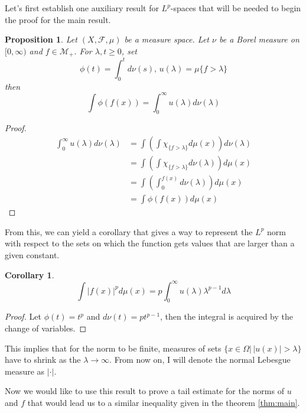 \documentclass[12pt]{artikel1}
\newtheorem{proposition}{Proposition}[section]
\newtheorem{corollary}{Corollary}[theorem]
\begin{document}
Let's first establish one auxiliary result for $L^p$-spaces that will be needed to begin the proof for the main result. 

\begin{proposition}
    Let $(X,\mathcal{F},\mu)$ be a measure space. Let $\nu$ be a Borel measure on $[0,\infty)$ and $f\in\mathcal{M}_+$. For $\lambda,t\geq0$, set
    \begin{equation*}
        \phi(t)=\int_0^td\nu(s),\, u(\lambda)=\mu\{f>\lambda\}
    \end{equation*}
    then
    \begin{equation*}
        \int \phi(f(x))=\int_0^\infty u(\lambda)d\nu(\lambda)
    \end{equation*}
\end{proposition}
\begin{proof}
    \begin{align*}
        \int_0^\infty u(\lambda)d\nu(\lambda)&=\int\left(\int\chi_{\{f>\lambda\}}d\mu(x)\right)d\nu(\lambda) \\
        &= \int\left(\int\chi_{\{f>\lambda\}}d\nu(\lambda)\right)d\mu(x) \\
        &=\int\left(\int_0^{f(x)}d\nu(\lambda)\right)d\mu(x) \\
        &=\int\phi(f(x))d\mu(x)
    \end{align*}
\end{proof}

\noindent From this, we can yield a corollary that gives a way to represent the $L^p$ norm with respect to the sets on which the function gets values that are larger than a given constant.

\begin{corollary}
    \begin{equation*}
        \int|f(x)|^pd\mu(x)=p\int_0^\infty u(\lambda)\lambda^{p-1}d\lambda
    \end{equation*}
\end{corollary}
\begin{proof}
    Let $\phi(t)=t^p$ and $d\nu(t)=pt^{p-1}$, then the integral is acquired by the change of variables.
\end{proof}

\noindent This implies that for the norm to be finite, measures of sets $\{x\in\Omega|\,|u(x)|>\lambda\}$ have to shrink as the $\lambda\rightarrow\infty$. From now on, I will denote the normal Lebesgue measure as $|\cdot|$.

Now we would like to use this result to prove a tail estimate for the norms of $u$ and $f$ that would lead us to a similar inequality given in the theorem \ref{thm:main}.

\clearpage
\printbibliography
\end{document}
